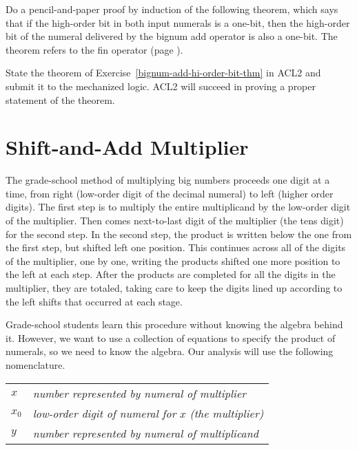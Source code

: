 \begin{ExerciseList}
\Exercise \label{bignum-add-hi-order-bit-thm}
Do a pencil-and-paper proof by induction of the following
theorem, which says that if the high-order bit in both input numerals is a one-bit,
then the high-order bit of the numeral delivered
by the bignum add operator is also a one-bit.
The theorem refers to the fin operator (page \pageref{fin-defun}).

\Exercise State the theorem of Exercise~\ref{bignum-add-hi-order-bit-thm}
in ACL2 and submit it to the mechanized logic. 
ACL2 will succeed in proving a proper statement of the theorem.
\end{ExerciseList}

\section{Shift-and-Add Multiplier}
\label{sec:bignum-mult}

The grade-school method of multiplying big numbers proceeds one digit at a time,
from right (low-order digit of the decimal numeral) to left (higher order digits).
The first step is to multiply the entire multiplicand by the low-order digit
of the multiplier.
Then comes next-to-last digit of the multiplier (the tens digit) for the second step.
In the second step, the product is written below the one from the first step,
but shifted left one position. 
This continues across all of the digits of the multiplier, one by one,
writing the products shifted one more position to the left at each step.
After the products are completed for
all the digits in the multiplier, they are totaled, taking care to keep
the digits lined up according to the left shifts that occurred at each stage.

Grade-school students learn this procedure without knowing
the algebra behind it. However, we want to use a collection of
equations to specify the product of numerals, so we need
to know the algebra. Our analysis will use the following nomenclature.

\begin{center}
\begin{tabular}{ll}
$x$       &\emph{number represented by numeral of multiplier} \\
$x_0$     &\emph{low-order digit of numeral for} $x$ \emph{(the multiplier) } \\
$y$       &\emph{ number represented by numeral of multiplicand} \\
\end{tabular}
\end{center}

